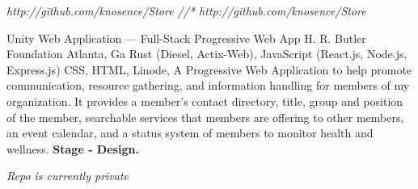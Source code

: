 \documentclass{resume-class/nadario_resume}
\begin{document}
          {}{\textit{http://github.com/knosence/Store //* http://github.com/knosence/Store}}


        {Unity Web Application --- Full-Stack Progressive Web App}
        {H. R. Butler Foundation}
        {Atlanta, Ga}
        {}{Rust (Diesel, Actix-Web), JavaScript (React.js, Node.js, Express.js) CSS, HTML, Linode, }
          \indent A Progressive Web Application to help promote communication, resource gathering, and information handling for members of my organization. It provides a member's contact directory, title, group and position of the member, searchable services that members are offering to other members, an event calendar, and a status system of members to monitor health and wellness.
          \textbf{Stage - Design.}

        {}{\textit{Repo is currently private}}
        \vspace{.25cm}
\end{document}
